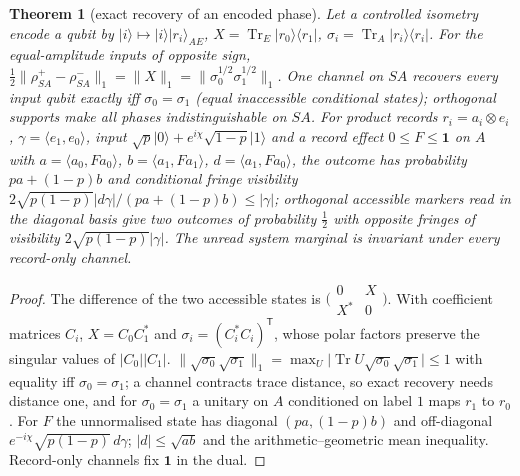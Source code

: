 \documentclass[aps,pra,onecolumn,superscriptaddress,nofootinbib,10pt]{revtex4-2}
\newtheorem{theorem}{Theorem}
\theoremstyle{definition}
\theoremstyle{remark}
\newcommand{\tr}{\operatorname{Tr}}
\newcommand{\ip}[2]{\langle #1,#2\rangle}
\begin{document}
\begin{theorem}[exact recovery of an encoded phase]\label{thm:fmeraser}
Let a controlled isometry encode a qubit by $\lvert i\rangle\mapsto\lvert i\rangle\lvert r_i\rangle_{AE}$, $X=\tr_E\lvert r_0\rangle\langle r_1\rvert$, $\sigma_i=\tr_A\lvert r_i\rangle\langle r_i\rvert$.  For the
equal-amplitude inputs of opposite sign,
$\tfrac12\lVert\rho^+_{SA}-\rho^-_{SA}\rVert_1=\lVert X\rVert_1=\lVert\sigma_0^{1/2}\sigma_1^{1/2}\rVert_1$.  One channel on $SA$ recovers every input qubit exactly iff $\sigma_0=\sigma_1$ (equal
inaccessible conditional states); orthogonal supports make all phases indistinguishable on $SA$.  For product
records $r_i=a_i\otimes e_i$, $\gamma=\ip{e_1}{e_0}$, input $\sqrt p\lvert0\rangle+e^{i\chi}\sqrt{1-p}\lvert1\rangle$ and a record effect $0\le F\le\mathbf1$ on $A$ with
$a=\ip{a_0}{Fa_0}$, $b=\ip{a_1}{Fa_1}$, $d=\ip{a_1}{Fa_0}$, the outcome has probability $pa+(1-p)b$ and conditional fringe visibility
$2\sqrt{p(1-p)}\lvert d\gamma\rvert/(pa+(1-p)b)\le\lvert\gamma\rvert$; orthogonal accessible markers read in the diagonal basis give two outcomes of probability $\tfrac12$
with opposite fringes of visibility $2\sqrt{p(1-p)}\lvert\gamma\rvert$.  The unread system marginal is invariant under every
record-only channel.
\end{theorem}
\begin{proof}
The difference of the two accessible states is $\bigl(\begin{smallmatrix}0&X\\ X^*&0\end{smallmatrix}\bigr)$.  With coefficient matrices $C_i$, $X=C_0C_1^*$ and $\sigma_i=(C_i^*C_i)^{\mathsf T}$,
whose polar factors preserve the singular values of $\lvert C_0\rvert\lvert C_1\rvert$.  $\lVert\sqrt{\sigma_0}\sqrt{\sigma_1}\rVert_1=\max_U\lvert\tr U\sqrt{\sigma_0}\sqrt{\sigma_1}\rvert\le1$ with equality iff
$\sigma_0=\sigma_1$; a channel contracts trace distance, so exact recovery needs distance one, and for $\sigma_0=\sigma_1$ a
unitary on $A$ conditioned on label $1$ maps $r_1$ to $r_0$.  For $F$ the unnormalised state has diagonal $(pa,(1-p)b)$ and
off-diagonal $e^{-i\chi}\sqrt{p(1-p)}\,d\gamma$; $\lvert d\rvert\le\sqrt{ab}$ and the arithmetic--geometric mean inequality.  Record-only channels fix $\mathbf1$ in
the dual.
\end{proof}
\end{document}
